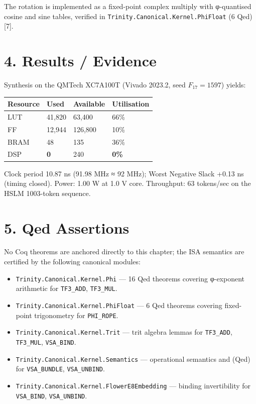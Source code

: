 The rotation is implemented as a fixed-point
complex multiply with φ-quantised cosine and sine
tables, verified in
\texttt{Trinity.Canonical.Kernel.PhiFloat} (6 Qed)
[7].

\section{4. Results /
Evidence}\label{fa_26:results-evidence}

Synthesis on the QMTech XC7A100T (Vivado 2023.2,
seed \(F_{17}=1597\)) yields:

\begin{longtable}[]{@{}llll@{}}
\toprule\noalign{}
Resource & Used & Available & Utilisation \\
\midrule\noalign{}
\endhead
\bottomrule\noalign{}
\endlastfoot
LUT & 41,820 & 63,400 & 66\% \\
FF & 12,944 & 126,800 & 10\% \\
BRAM & 48 & 135 & 36\% \\
DSP & \textbf{0} & 240 & \textbf{0\%} \\
\end{longtable}

Clock period 10.87 ns (91.98 MHz ≈ 92 MHz); Worst
Negative Slack +0.13 ns (timing closed). Power:
1.00 W at 1.0 V core. Throughput: 63 tokens/sec on
the HSLM 1003-token sequence.

\section{5. Qed
Assertions}\label{fa_26:qed-assertions}

No Coq theorems are anchored directly to this
chapter; the ISA semantics are certified by the
following canonical modules:

\begin{itemize}
\tightlist
\item
  \texttt{Trinity.Canonical.Kernel.Phi} --- 16 Qed
  theorems covering φ-exponent arithmetic for
  \texttt{TF3\_ADD}, \texttt{TF3\_MUL}.
\item
  \texttt{Trinity.Canonical.Kernel.PhiFloat} --- 6
  Qed theorems covering fixed-point trigonometry
  for \texttt{PHI\_ROPE}.
\item
  \texttt{Trinity.Canonical.Kernel.Trit} --- trit
  algebra lemmas for \texttt{TF3\_ADD},
  \texttt{TF3\_MUL}, \texttt{VSA\_BIND}.
\item
  \texttt{Trinity.Canonical.Kernel.Semantics} ---
  operational semantics and
   (Qed) for
  \texttt{VSA\_BUNDLE}, \texttt{VSA\_UNBIND}.
\item
  \texttt{Trinity.Canonical.Kernel.FlowerE8Embedding}
  --- binding invertibility for
  \texttt{VSA\_BIND}, \texttt{VSA\_UNBIND}.
\end{itemize}


